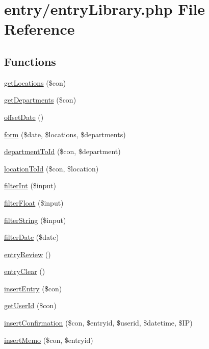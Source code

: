 \hypertarget{entry_library_8php}{}\section{entry/entry\+Library.php File Reference}
\label{entry_library_8php}
\subsection*{Functions}
\begin{DoxyCompactItemize}
\item 
\hyperlink{entry_library_8php_a80f0f920d3c753bb4d3ce744c602f22c}{get\+Locations} (\$con)
\item 
\hyperlink{entry_library_8php_a3144a911d05c41bd6eb0fc32c7ad02b9}{get\+Departments} (\$con)
\item 
\hyperlink{entry_library_8php_ac13edd684574861a5e26f7e0f84ef5a3}{offset\+Date} ()
\item 
\hyperlink{entry_library_8php_a44acbb1464d6087b72aa34070b0ca7a9}{form} (\$date, \$locations, \$departments)
\item 
\hyperlink{entry_library_8php_a628b0434043d9c6c694cb3f019dde312}{department\+To\+Id} (\$con, \$department)
\item 
\hyperlink{entry_library_8php_a82883067e7ce3af084a689781acadc10}{location\+To\+Id} (\$con, \$location)
\item 
\hyperlink{entry_library_8php_af8b4d6af446ee1a1da82accb07140c6f}{filter\+Int} (\$input)
\item 
\hyperlink{entry_library_8php_af071373943df9bc67a10f149e87cf4f6}{filter\+Float} (\$input)
\item 
\hyperlink{entry_library_8php_aa1a0f8c5ca5cd64b0ec9034a769d0a54}{filter\+String} (\$input)
\item 
\hyperlink{entry_library_8php_a2710911dba21b4ef81d746296ac33b1e}{filter\+Date} (\$date)
\item 
\hyperlink{entry_library_8php_aad16d1ba0e1533b08a8df404cfedc01e}{entry\+Review} ()
\item 
\hyperlink{entry_library_8php_a64878a2f3a5ccc6246763e8e0ea05504}{entry\+Clear} ()
\item 
\hyperlink{entry_library_8php_a8afbb7b50b6f7ecb19366b39b169e0f0}{insert\+Entry} (\$con)
\item 
\hyperlink{entry_library_8php_a4755dafd9341dedfdc581773a8c11bc2}{get\+User\+Id} (\$con)
\item 
\hyperlink{entry_library_8php_affaf766933efba19686b3b0c99137b21}{insert\+Confirmation} (\$con, \$entryid, \$userid, \$datetime, \$IP)
\item 
\hyperlink{entry_library_8php_a3c5d4e00ae5281937dbe290c697582ea}{insert\+Memo} (\$con, \$entryid)
\end{DoxyCompactItemize}


